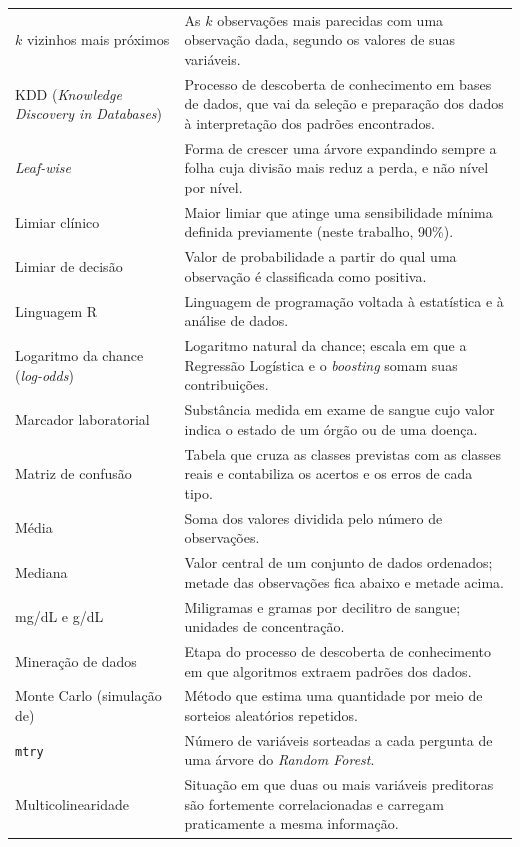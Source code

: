 \begin{longtable}{@{}p{3.8cm}p{10.7cm}@{}}
$k$ vizinhos mais próximos & As $k$ observações mais parecidas com uma observação dada, segundo os valores de suas variáveis. \\[0.15cm]
KDD (\textit{Knowledge Discovery in Databases}) & Processo de descoberta de conhecimento em bases de dados, que vai da seleção e preparação dos dados à interpretação dos padrões encontrados. \\[0.15cm]
\textit{Leaf-wise} & Forma de crescer uma árvore expandindo sempre a folha cuja divisão mais reduz a perda, e não nível por nível. \\[0.15cm]
Limiar clínico & Maior limiar que atinge uma sensibilidade mínima definida previamente (neste trabalho, 90\%). \\[0.15cm]
Limiar de decisão & Valor de probabilidade a partir do qual uma observação é classificada como positiva. \\[0.15cm]
Linguagem R & Linguagem de programação voltada à estatística e à análise de dados. \\[0.15cm]
Logaritmo da chance (\textit{log-odds}) & Logaritmo natural da chance; escala em que a Regressão Logística e o \textit{boosting} somam suas contribuições. \\[0.15cm]
Marcador laboratorial & Substância medida em exame de sangue cujo valor indica o estado de um órgão ou de uma doença. \\[0.15cm]
Matriz de confusão & Tabela que cruza as classes previstas com as classes reais e contabiliza os acertos e os erros de cada tipo. \\[0.15cm]
Média & Soma dos valores dividida pelo número de observações. \\[0.15cm]
Mediana & Valor central de um conjunto de dados ordenados; metade das observações fica abaixo e metade acima. \\[0.15cm]
mg/dL e g/dL & Miligramas e gramas por decilitro de sangue; unidades de concentração. \\[0.15cm]
Mineração de dados & Etapa do processo de descoberta de conhecimento em que algoritmos extraem padrões dos dados. \\[0.15cm]
Monte Carlo (simulação de) & Método que estima uma quantidade por meio de sorteios aleatórios repetidos. \\[0.15cm]
\texttt{mtry} & Número de variáveis sorteadas a cada pergunta de uma árvore do \textit{Random Forest}. \\[0.15cm]
Multicolinearidade & Situação em que duas ou mais variáveis preditoras são fortemente correlacionadas e carregam praticamente a mesma informação. \\[0.15cm]

\end{longtable}
